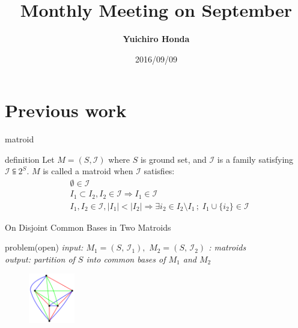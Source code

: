 \documentclass[11pt,xcolor=dvipsnames,table,dvipdfmx]{beamer}
\title{Monthly Meeting on September}
\author{\textbf{Yuichiro Honda}}
\date{2016/09/09}
\institute{Morita lab. M1}
\begin{document}
\maketitle

\section{Previous work}
\begin{frame}{matroid}
 \begin{block}{definition}
  Let $M = (S, \mathcal{I})$ where $S$ is ground set, and $\mathcal{I}$ is a family satisfying $\mathcal{I} \subseteqq 2^S$. $M$ is called a \alert{matroid} when $\mathcal{I}$ satisfies:
  \begin{align}
   &\emptyset \in \mathcal{I} \\
   &I_1 \subset I_2 , I_2 \in \mathcal{I} \Rightarrow I_1 \in \mathcal{I} \\
   &I_1 , I_2 \in \mathcal{I} , |I_1| < |I_2| \Rightarrow \exists i_2 \in I_2 \setminus I_1 \, ; \; I_1 \cup \{i_2\} \in \mathcal{I}
  \end{align}
 \end{block}
\end{frame}


\begin{frame}{On Disjoint Common Bases in Two Matroids}
 \begin{alertblock}{problem(open)} \it
  input: $M_1 = (S,\,\mathcal{I}_1),\,\,M_2 = (S,\,\mathcal{I}_2)$ : matroids \\
  output: partition of $S$ into common bases of $M_1$ and $M_2$ \\
  \begin{figure}
   \centering
   \includegraphics[width=2cm]{partitioned-graph.png}
  \end{figure}
 \end{alertblock}
 \vspace{0.5cm}
\end{frame}
\end{document}
